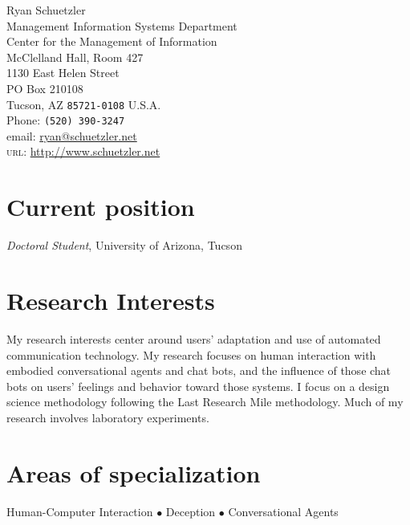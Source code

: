 \documentclass[10pt, a4paper]{article}
\newcommand{\years}[1]{\marginnote{\scriptsize #1}}
\begin{document}
{\LARGE Ryan Schuetzler}\\[1cm]
 Management Information Systems Department\\
 Center for the Management of Information\\
 McClelland Hall, Room 427\\
 1130 East Helen Street\\
 PO Box 210108\\
 Tucson, AZ \texttt{85721-0108}
U.S.A.\\[.2cm]
Phone: \texttt{(520) 390-3247}\\[.2cm]
email: \href{mailto:ryan@schuetzler.net}{ryan@schuetzler.net}\\
\textsc{url}: \href{http://www.schuetzler.net}{http://www.schuetzler.net}\\ 
\vfill

\section*{Current position}
\emph{Doctoral Student}, University of Arizona, Tucson


\section*{Research Interests}

My research interests center around users' adaptation and use of automated
communication technology. My research focuses on human interaction with embodied
conversational agents and chat bots, and the influence of those chat bots on
users' feelings and behavior toward those systems. I focus on a design science
methodology following the Last Research Mile methodology. Much of my research
involves laboratory experiments.

\section*{Areas of specialization}
Human-Computer Interaction $\bullet$  Deception $\bullet$ Conversational Agents

\end{document}
